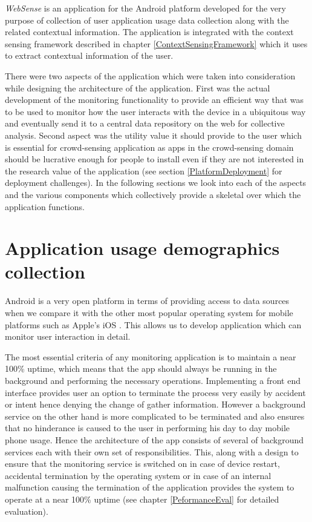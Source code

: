 \documentclass[12pt]{report}
\begin{document}
\textit{WebSense} is an application for the Android platform developed for the very purpose of collection of user application usage data collection along with the related contextual information. The application is integrated with the context sensing framework described in chapter \ref{ContextSensingFramework} which it uses to extract contextual information of the user.

There were two aspects of the application which were taken into consideration while designing the architecture of the application. First was the actual development of the monitoring functionality to provide an efficient way that was to be used to monitor how the user interacts with the device in a ubiquitous way and eventually send it to a central data repository on the web for collective analysis. Second aspect was the utility value it should provide to the user which is essential for crowd-sensing application as apps in the crowd-sensing domain should be lucrative enough for people to install even if they are not interested in the research value of the application (see section \ref{PlatformDeployment} for deployment challenges). In the following sections we look into each of the aspects and the various components which collectively provide a skeletal over which the application functions.

\section{Application usage demographics collection}

Android is a very open platform in terms of providing access to data sources when we compare it with the other most popular operating system for mobile platforms such as Apple's iOS \cite{AppleiOSPolicy}. This allows us to develop application which can monitor user interaction in detail.

The most essential criteria of any monitoring application is to maintain a near 100\% uptime, which means that the app should always be running in the background and performing the necessary operations. Implementing a front end interface provides user an option to terminate the process very easily by accident or intent hence denying the change of gather information. However a background service on the other hand is more complicated to be terminated and also ensures that no hinderance is caused to the user in performing his day to day mobile phone usage. Hence the architecture of the app consists of several of background services each with their own set of responsibilities. This, along with a design to ensure that the monitoring service is switched on in case of device restart, accidental termination by the operating system or in case of an internal malfunction causing the termination of the application provides the system to operate at a near 100\% uptime (see chapter \ref{PeformanceEval} for detailed evaluation).
\end{document}
